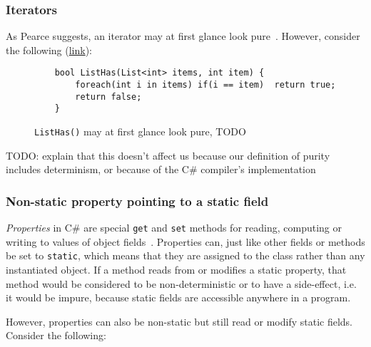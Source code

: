 \documentclass[a4paper,12pt]{article}
\begin{document}
\subsubsection{Iterators}


As Pearce suggests, an iterator may at first glance look pure~\cite{pearce2011jpure}. However, consider the following (\href{https://docs.microsoft.com/en-us/archive/msdn-magazine/2017/april/essential-net-understanding-csharp-foreach-internals-and-custom-iterators-with-yield}{link}):

\begin{figure}[H]
  \centering
  \begin{lstlisting}
    bool ListHas(List<int> items, int item) {
        foreach(int i in items) if(i == item)  return true;
        return false;
    }
  \end{lstlisting}
  \caption{\texttt{ListHas()} may at first glance look pure, TODO}
  \label{fig:iterator-example}
\end{figure}

TODO: explain that this doesn't affect us because our definition of purity includes determinism, or because of the C\# compiler's implementation

\subsubsection{Non-static property pointing to a static field} \label{ssub:non-static-property}
\textit{Properties} in C\# are special \texttt{get} and \texttt{set} methods for reading, computing or writing to values of object fields~\cite{microsoft-properties}. Properties can, just like other fields or methods be set to \texttt{static}, which means that they are assigned to the class rather than any instantiated object. If a method reads from or modifies a static property, that method would be considered to be non-deterministic or to have a side-effect, i.e. it would be impure, because static fields are accessible anywhere in a program.

However, properties can also be non-static but still read or modify static fields. Consider the following:
\end{document}
